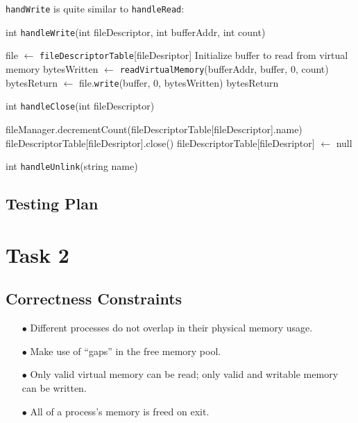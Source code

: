\documentclass{article}
\begin{document}
\begin{spacing}{1.1}
\texttt{handWrite} is quite similar to \texttt{handleRead}:

\begin{algorithm}[htbp]
  \caption{int \texttt{handleWrite}(int fileDescriptor, int bufferAddr, int count)}
\begin{algorithmic}[1]
  \ENDIF
  \STATE file $\leftarrow$ \texttt{fileDescriptorTable}[fileDesriptor]
  \ENDIF
  \STATE Initialize buffer to read from virtual memory
  \STATE bytesWritten $\leftarrow$ \texttt{readVirtualMemory}(bufferAddr, buffer, 0, count)
  \ENDIF
  \STATE bytesReturn $\leftarrow$ file.\texttt{write}(buffer, 0, bytesWritten)
  \ENDIF
  \RETURN bytesReturn
\end{algorithmic}
\end{algorithm}

\begin{algorithm}[htbp]
  \caption{int \texttt{handleClose}(int fileDescriptor)}
\begin{algorithmic}[1]
  \ENDIF
  \STATE fileManager.decrementCount(fileDescriptorTable[fileDescriptor].name)
  \STATE fileDescriptorTable[fileDesriptor].close()
  \STATE fileDescriptorTable[fileDesriptor] $\leftarrow$ null
\end{algorithmic}
\end{algorithm}

\begin{algorithm}[htbp]
  \caption{int \texttt{handleUnlink}(string name)}
\begin{algorithmic}[1]
  \ENDIF
\end{algorithmic}
\end{algorithm}



\subsection{Testing Plan}


\section{Task 2}

\subsection{Correctness Constraints}
\begin{enumerate}
  \item[$\bullet$] Different processes do not overlap in their physical memory usage.
  \item[$\bullet$] Make use of ``gaps'' in the free memory pool.
  \item[$\bullet$] Only valid virtual memory can be read; only valid and writable
    memory can be written.
  \item[$\bullet$] All of a process's memory is freed on exit.
\end{enumerate}


\end{spacing}
\end{document}
